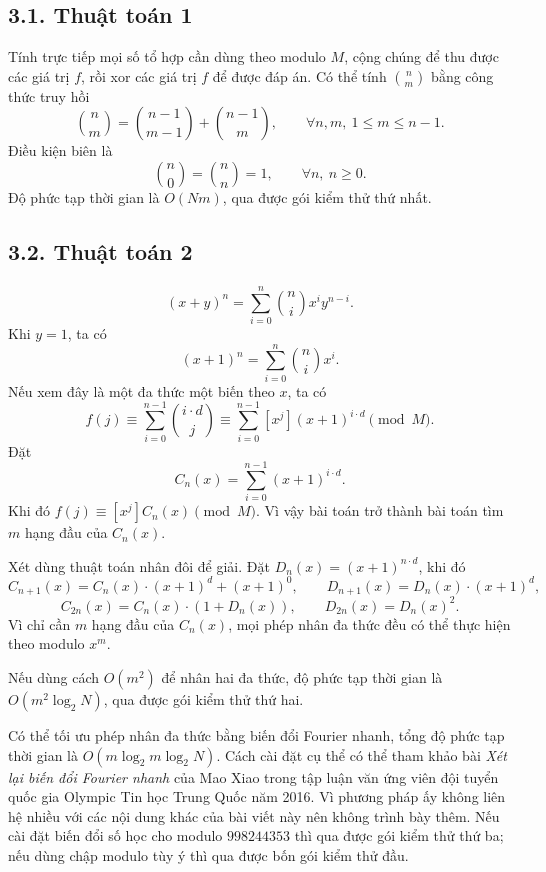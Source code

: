 \documentclass[11pt]{article}
\begin{document}
\subsection*{3.1. Thuật toán 1}

Tính trực tiếp mọi số tổ hợp cần dùng theo modulo \(M\), cộng chúng để thu
được các giá trị \(f\), rồi xor các giá trị \(f\) để được đáp án. Có thể tính
\(\binom{n}{m}\) bằng công thức truy hồi
\[
  \binom{n}{m}=\binom{n-1}{m-1}+\binom{n-1}{m},
  \qquad \forall n,m,\ 1\le m\le n-1.
\]
Điều kiện biên là
\[
  \binom{n}{0}=\binom{n}{n}=1,\qquad \forall n,\ n\ge0.
\]
Độ phức tạp thời gian là \(O(Nm)\), qua được gói kiểm thử thứ nhất.

\subsection*{3.2. Thuật toán 2}

\paragraph{}
\[
  (x+y)^n=\sum_{i=0}^{n}\binom{n}{i}x^i y^{n-i}.
\]
Khi \(y=1\), ta có
\[
  (x+1)^n=\sum_{i=0}^{n}\binom{n}{i}x^i.
\]
Nếu xem đây là một đa thức một biến theo \(x\), ta có
\[
  f(j)\equiv \sum_{i=0}^{n-1}\binom{i\cdot d}{j}
  \equiv \sum_{i=0}^{n-1}[x^j](x+1)^{i\cdot d}\pmod M.
\]
Đặt
\[
  C_n(x)=\sum_{i=0}^{n-1}(x+1)^{i\cdot d}.
\]
Khi đó \(f(j)\equiv [x^j]C_n(x)\pmod M\). Vì vậy bài toán trở thành bài toán
tìm \(m\) hạng đầu của \(C_n(x)\).

Xét dùng thuật toán nhân đôi để giải. Đặt \(D_n(x)=(x+1)^{n\cdot d}\), khi đó
\[
  C_{n+1}(x)=C_n(x)\cdot(x+1)^d+(x+1)^0,\qquad
  D_{n+1}(x)=D_n(x)\cdot(x+1)^d,
\]
\[
  C_{2n}(x)=C_n(x)\cdot(1+D_n(x)),\qquad
  D_{2n}(x)=D_n(x)^2.
\]
Vì chỉ cần \(m\) hạng đầu của \(C_n(x)\), mọi phép nhân đa thức đều có thể
thực hiện theo modulo \(x^m\).

Nếu dùng cách \(O(m^2)\) để nhân hai đa thức, độ phức tạp thời gian là
\(O(m^2\log_2 N)\), qua được gói kiểm thử thứ hai.

Có thể tối ưu phép nhân đa thức bằng biến đổi Fourier nhanh, tổng độ phức tạp
thời gian là \(O(m\log_2 m\log_2 N)\). Cách cài đặt cụ thể có thể tham khảo
bài \emph{Xét lại biến đổi Fourier nhanh} của Mao Xiao trong tập luận văn ứng
viên đội tuyển quốc gia Olympic Tin học Trung Quốc năm 2016. Vì phương pháp
ấy không liên hệ nhiều với các nội dung khác của bài viết này nên không trình
bày thêm. Nếu cài đặt biến đổi số học cho modulo \(998244353\) thì qua được
gói kiểm thử thứ ba; nếu dùng chập modulo tùy ý thì qua được bốn gói kiểm thử
đầu.
\end{document}
